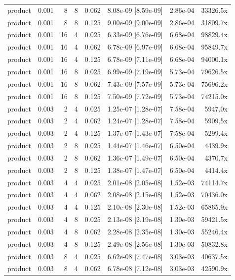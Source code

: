 \begin{tabular}{lrrrrrrr}
product & 0.001 & 8 & 8 & 0.062 & 8.08e-09 [8.59e-09] & 2.86e-04 & 33326.5x \\
product & 0.001 & 8 & 8 & 0.125 & 9.00e-09 [9.00e-09] & 2.86e-04 & 31809.7x \\
product & 0.001 & 16 & 4 & 0.025 & 6.33e-09 [6.76e-09] & 6.68e-04 & 98829.4x \\
product & 0.001 & 16 & 4 & 0.062 & 6.78e-09 [6.97e-09] & 6.68e-04 & 95849.7x \\
product & 0.001 & 16 & 4 & 0.125 & 6.78e-09 [7.11e-09] & 6.68e-04 & 94000.1x \\
product & 0.001 & 16 & 8 & 0.025 & 6.99e-09 [7.19e-09] & 5.73e-04 & 79626.5x \\
product & 0.001 & 16 & 8 & 0.062 & 7.43e-09 [7.57e-09] & 5.73e-04 & 75696.2x \\
product & 0.001 & 16 & 8 & 0.125 & 7.50e-09 [7.72e-09] & 5.73e-04 & 74215.0x \\
product & 0.003 & 2 & 4 & 0.025 & 1.25e-07 [1.28e-07] & 7.58e-04 & 5947.0x \\
product & 0.003 & 2 & 4 & 0.062 & 1.24e-07 [1.28e-07] & 7.58e-04 & 5909.5x \\
product & 0.003 & 2 & 4 & 0.125 & 1.37e-07 [1.43e-07] & 7.58e-04 & 5299.4x \\
product & 0.003 & 2 & 8 & 0.025 & 1.44e-07 [1.46e-07] & 6.50e-04 & 4439.9x \\
product & 0.003 & 2 & 8 & 0.062 & 1.36e-07 [1.49e-07] & 6.50e-04 & 4370.7x \\
product & 0.003 & 2 & 8 & 0.125 & 1.38e-07 [1.47e-07] & 6.50e-04 & 4414.4x \\
product & 0.003 & 4 & 4 & 0.025 & 2.01e-08 [2.05e-08] & 1.52e-03 & 74114.7x \\
product & 0.003 & 4 & 4 & 0.062 & 2.08e-08 [2.15e-08] & 1.52e-03 & 70436.0x \\
product & 0.003 & 4 & 4 & 0.125 & 2.10e-08 [2.30e-08] & 1.52e-03 & 65865.9x \\
product & 0.003 & 4 & 8 & 0.025 & 2.13e-08 [2.19e-08] & 1.30e-03 & 59421.5x \\
product & 0.003 & 4 & 8 & 0.062 & 2.28e-08 [2.35e-08] & 1.30e-03 & 55246.4x \\
product & 0.003 & 4 & 8 & 0.125 & 2.49e-08 [2.56e-08] & 1.30e-03 & 50832.8x \\
product & 0.003 & 8 & 4 & 0.025 & 6.62e-08 [7.47e-08] & 3.03e-03 & 40637.5x \\
product & 0.003 & 8 & 4 & 0.062 & 6.78e-08 [7.12e-08] & 3.03e-03 & 42590.9x \\

\end{tabular}
